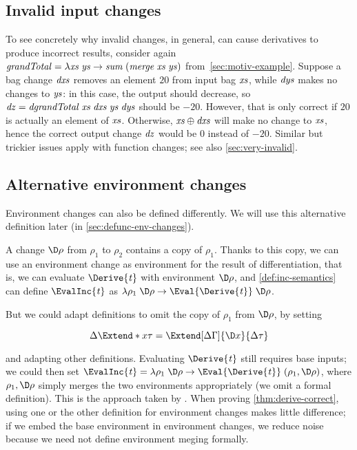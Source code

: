 \subsection{Invalid input changes}
\label{sec:invalid}
To see concretely why invalid changes, in general, can cause
derivatives to produce
incorrect results, consider again \ensuremath{\Varid{grandTotal}\mathrel{=}\lambda \Varid{xs}\;\Varid{ys}\to \Varid{sum}\;(\Varid{merge}\;\Varid{xs}\;\Varid{ys})} from~\cref{sec:motiv-example}.
Suppose a bag change \ensuremath{\Varid{dxs}} removes an element
\ensuremath{\mathrm{20}} from input bag \ensuremath{\Varid{xs}}, while \ensuremath{\Varid{dys}} makes no changes to \ensuremath{\Varid{ys}}:
in this case, the output should decrease, so \ensuremath{\Varid{dz}\mathrel{=}\Varid{dgrandTotal}\;\Varid{xs}\;\Varid{dxs}\;\Varid{ys}\;\Varid{dys}} should be \ensuremath{\mathbin{-}\mathrm{20}}. However, that is only correct if
\ensuremath{\mathrm{20}} is actually an element of \ensuremath{\Varid{xs}}. Otherwise, \ensuremath{\Varid{xs}\oplus \Varid{dxs}}
will make no change to \ensuremath{\Varid{xs}}, hence the correct output change \ensuremath{\Varid{dz}} would be \ensuremath{\mathrm{0}}
instead of \ensuremath{\mathbin{-}\mathrm{20}}. Similar but trickier issues apply with function
changes; see also \cref{sec:very-invalid}.

\subsection{Alternative environment changes}
\label{sec:envs-without-base-inputs-intro}
Environment changes can also be defined differently. We will use
this alternative definition later (in
\cref{sec:defunc-env-changes}).

A change \ensuremath{\D\rho} from \ensuremath{\rho_{1}} to \ensuremath{\rho_{2}} contains a copy of \ensuremath{\rho_{1}}.
Thanks to this copy, we can use an environment change as
environment for the result of differentiation, that is, we can
evaluate \ensuremath{\Derive{\Varid{t}}} with environment \ensuremath{\D\rho}, and
\cref{def:inc-semantics} can define \ensuremath{\EvalInc{\Varid{t}}} as \ensuremath{\lambda \rho_{1}\;\D\rho\to \Eval{\Derive{\Varid{t}}}\;\D\rho}.

But we could adapt definitions to omit the copy of \ensuremath{\rho_{1}} from
\ensuremath{\D\rho}, by setting

\[\Delta\Extend*{x}{\tau} = \Extend[\Delta\Gamma]{\D
    x}{\Delta\tau}\]

\noindent and adapting other definitions. Evaluating \ensuremath{\Derive{\Varid{t}}}
still requires base inputs; we could then set \ensuremath{\EvalInc{\Varid{t}}\mathrel{=}\lambda \rho_{1}\;\D\rho\to \Eval{\Derive{\Varid{t}}}\;(\rho_{1},\D\rho)}, where \ensuremath{\rho_{1},\D\rho} simply
merges the two environments appropriately (we omit a formal
definition). This is the approach taken by
\citet{CaiEtAl2014ILC}. When proving \cref{thm:derive-correct},
using one or the other definition for environment changes makes
little difference; if we embed the base environment in
environment changes, we reduce noise because we need not define
environment meging formally.

